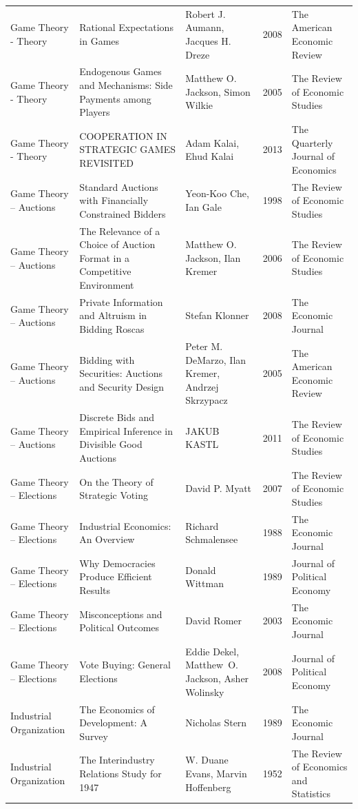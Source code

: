 \begin{xltabular}[p]{\hsize}{sYsrs}
Game Theory -  Theory & Rational Expectations in Games & Robert J. Aumann, Jacques H. Dreze & 2008 & The American Economic Review \\
Game Theory -  Theory & Endogenous Games and Mechanisms: Side Payments among Players & Matthew O. Jackson, Simon Wilkie & 2005 & The Review of Economic Studies \\
Game Theory -  Theory & COOPERATION IN STRATEGIC GAMES REVISITED & Adam Kalai, Ehud Kalai & 2013 & The Quarterly Journal of Economics \\
Game Theory – Auctions & Standard Auctions with Financially Constrained Bidders & Yeon-Koo Che, Ian Gale & 1998 & The Review of Economic Studies \\
Game Theory – Auctions & The Relevance of a Choice of Auction Format in a Competitive Environment & Matthew O. Jackson, Ilan Kremer & 2006 & The Review of Economic Studies \\
Game Theory – Auctions & Private Information and Altruism in Bidding Roscas & Stefan Klonner & 2008 & The Economic Journal \\
Game Theory – Auctions & Bidding with Securities: Auctions and Security Design & Peter M. DeMarzo, Ilan Kremer, Andrzej Skrzypacz & 2005 & The American Economic Review \\
Game Theory – Auctions & Discrete Bids and Empirical Inference in Divisible Good Auctions & JAKUB KASTL & 2011 & The Review of Economic Studies \\
Game Theory – Elections & On the Theory of Strategic Voting & David P. Myatt & 2007 & The Review of Economic Studies \\
Game Theory – Elections & Industrial Economics: An Overview & Richard Schmalensee & 1988 & The Economic Journal \\
Game Theory – Elections & Why Democracies Produce Efficient Results & Donald Wittman & 1989 & Journal of Political Economy \\
Game Theory – Elections & Misconceptions and Political Outcomes & David Romer & 2003 & The Economic Journal \\
Game Theory – Elections & Vote Buying: General Elections & Eddie Dekel, Matthew O. Jackson, Asher Wolinsky & 2008 & Journal of Political Economy \\
Industrial Organization & The Economics of Development: A Survey & Nicholas Stern & 1989 & The Economic Journal \\
Industrial Organization & The Interindustry Relations Study for 1947 & W. Duane Evans, Marvin Hoffenberg & 1952 & The Review of Economics and Statistics \\

\end{xltabular}
